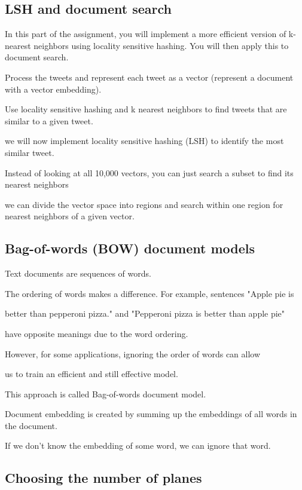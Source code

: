 \documentclass[4apaper,12pt]{book}
\begin{document}
\begin{description}
  \subsection{LSH and document search}
\item In this part of the assignment, you will implement a more efficient version of k-nearest neighbors using locality sensitive hashing. You will then apply this to document search.

\item Process the tweets and represent each tweet as a vector (represent a document with a vector embedding).
\item Use locality sensitive hashing and k nearest neighbors to find tweets that are similar to a given tweet.
\item we will now implement locality sensitive hashing (LSH) to identify the most similar tweet.
\item Instead of looking at all 10,000 vectors, you can just search a subset to find its nearest neighbors
\item we can divide the vector space into regions and search within one region for nearest neighbors of a given vector.

\subsection{Bag-of-words (BOW) document models}
\item Text documents are sequences of words.
\item The ordering of words makes a difference. For example, sentences "Apple pie is
\item better than pepperoni pizza." and "Pepperoni pizza is better than apple pie"
\item have opposite meanings due to the word ordering.
\item However, for some applications, ignoring the order of words can allow
\item us to train an efficient and still effective model.
\item This approach is called Bag-of-words document model.

\item Document embedding is created by summing up the embeddings of all words
in the document.
\item If we don't know the embedding of some word, we can ignore that word.

\subsection{ Choosing the number of planes}


\end{description}
\end{document}
